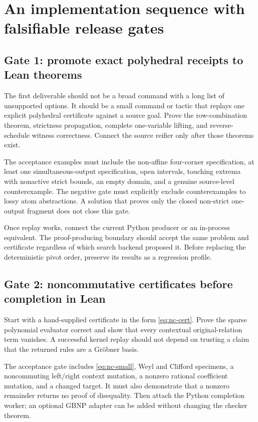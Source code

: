 \section{An implementation sequence with falsifiable release gates}
\label{sec:roadmap}

\subsection{Gate 1: promote exact polyhedral receipts to Lean theorems}
The first deliverable should not be a broad \forge{} command with a long list of unsupported options. It should be a small command or tactic that replays one explicit polyhedral certificate against a source goal. Prove the row-combination theorem, strictness propagation, complete one-variable lifting, and reverse-schedule witness correctness. Connect the source reifier only after those theorems exist.

The acceptance examples must include the non-affine four-corner specification, at least one simultaneous-output specification, open intervals, touching extrema with nonactive strict bounds, an empty domain, and a genuine source-level counterexample. The negative gate must explicitly exclude counterexamples to lossy atom abstractions. A solution that proves only the closed non-strict one-output fragment does not close this gate.

Once replay works, connect the current Python producer or an in-process equivalent. The proof-producing boundary should accept the same problem and certificate regardless of which search backend proposed it. Before replacing the deterministic pivot order, preserve its results as a regression profile.

\subsection{Gate 2: noncommutative certificates before completion in Lean}
Start with a hand-supplied certificate in the form \eqref{eq:nc-cert}. Prove the sparse polynomial evaluator correct and show that every contextual original-relation term vanishes. A successful kernel replay should not depend on trusting a claim that the returned rules are a Gr\"obner basis.

The acceptance gate includes \eqref{eq:nc-small}, Weyl and Clifford specimens, a noncommuting left/right context mutation, a nonzero rational coefficient mutation, and a changed target. It must also demonstrate that a nonzero remainder returns no proof of disequality. Then attach the Python completion worker; an optional GBNP adapter can be added without changing the checker theorem.

